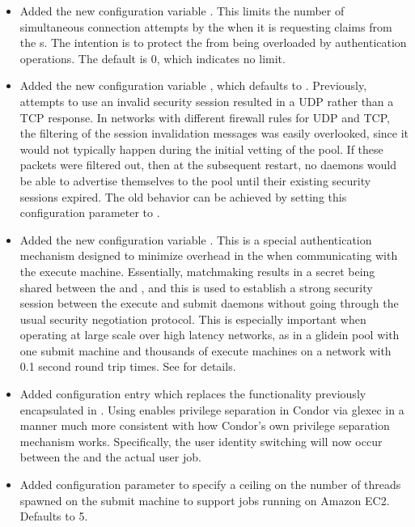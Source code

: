\begin{itemize}

\item Added the new configuration variable
.  This limits the
number of simultaneous connection attempts by the  when
it is requesting claims from the s.  The intention is
to protect the  from being overloaded by authentication
operations.  The default is 0, which indicates no limit.

\item Added the new configuration variable
,  which
defaults to .  Previously, attempts to use an invalid security
session resulted in a UDP rather than a TCP response.  In networks with
different firewall rules for UDP and TCP, the filtering of the session
invalidation messages was easily overlooked, since it would not
typically happen during the initial vetting of the pool.  If these
packets were filtered out, then at the subsequent 
restart, no daemons would be able to advertise themselves to the
pool until their existing security sessions expired.  The old behavior
can be achieved by setting this configuration parameter to .

\item Added the new configuration variable
.
This is a special authentication mechanism designed to minimize
overhead in the  when communicating with the execute
machine.  Essentially, matchmaking results in a secret being shared
between the  and , and this is used to
establish a strong security session between the execute and submit
daemons without going through the usual security negotiation protocol.
This is especially important when operating at large scale over high
latency networks, as in a glidein pool with one submit machine and thousands of
execute machines on a network with 0.1 second round trip times.  See
\pageref{param:SecEnableMatchPasswordAuthentication} for
details.

\item Added configuration entry  which replaces the
	functionality previously encapsulated in .  Using
	 enables privilege separation in Condor via glexec in a
	manner much more consistent with how Condor's own privilege separation
	mechanism works.  Specifically, the user identity switching will now occur
	between the  and the actual user job.

\item Added configuration parameter 
	to specify a ceiling on the number of threads spawned on the submit
	machine to support jobs running on Amazon EC2.  Defaults to 5.

\end{itemize}

